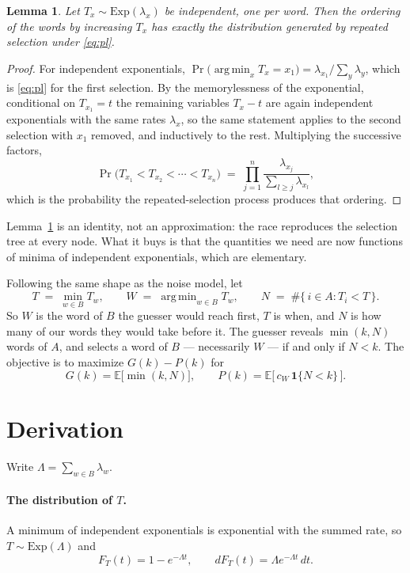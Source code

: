 \documentclass[12pt]{article}
\DeclareMathOperator*{\argmin}{arg\,min}
\newtheorem{lemma}{Lemma}
\begin{document}
\begin{lemma}
  \label{lem:race}
  Let $T_x \sim \mathrm{Exp}(\lambda_x)$ be independent, one per word. Then the
  ordering of the words by increasing $T_x$ has exactly the distribution
  generated by repeated selection under \eqref{eq:pl}.
\end{lemma}

\begin{proof}
  For independent exponentials, $\Pr\bigl(\argmin_x T_x = x_1\bigr) =
  \lambda_{x_1} / \sum_y \lambda_y$, which is \eqref{eq:pl} for the first
  selection. By the memorylessness of the exponential, conditional on
  $T_{x_1} = t$ the remaining variables $T_x - t$ are again independent
  exponentials with the same rates $\lambda_x$, so the same statement applies
  to the second selection with $x_1$ removed, and inductively to the rest.
  Multiplying the successive factors,
  \[ \Pr\bigl(T_{x_1} < T_{x_2} < \cdots < T_{x_n}\bigr)
     \;=\; \prod_{j=1}^{n} \frac{\lambda_{x_j}}{\sum_{l \ge j} \lambda_{x_l}}, \]
  which is the probability the repeated-selection process produces that
  ordering. \qedhere
\end{proof}

Lemma~\ref{lem:race} is an identity, not an approximation: the race reproduces
the selection tree at every node. What it buys is that the quantities we need
are now functions of minima of independent exponentials, which are elementary.

Following the same shape as the noise model, let
\[ T \;=\; \min_{w \in B} T_w, \qquad
   W \;=\; \argmin_{w \in B} T_w, \qquad
   N \;=\; \#\{\, i \in A : T_i < T \,\}. \]
So $W$ is the word of $B$ the guesser would reach first, $T$ is when, and $N$
is how many of our words they would take before it. The guesser reveals
$\min(k, N)$ words of $A$, and selects a word of $B$ --- necessarily $W$ ---
if and only if $N < k$. The objective is to maximize $G(k) - P(k)$ for
\[ G(k) = \mathbb E\bigl[\min(k, N)\bigr], \qquad
   P(k) = \mathbb E\bigl[\, c_W \, \mathbf 1\{N < k\} \,\bigr]. \]

\section{Derivation}
\label{sec:derivation}

Write $\Lambda = \sum_{w \in B} \lambda_w$.

\paragraph{The distribution of $T$.} A minimum of independent exponentials is
exponential with the summed rate, so $T \sim \mathrm{Exp}(\Lambda)$ and
\begin{equation}
  \label{eq:T}
  F_T(t) = 1 - e^{-\Lambda t}, \qquad dF_T(t) = \Lambda e^{-\Lambda t}\, dt .
\end{equation}
\end{document}
